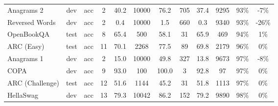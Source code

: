 \documentclass{article}
\begin{document}
\begin{table}
{\begin{adjustwidth}{-1.4in}{-1.4in}
\begin{center}
\begin{tabular}{lccccccccccc}
          Anagrams 2 &   dev &      acc &   2 &        40.2 &                     10000 &                            76.2 &                       705 &                            37.4 &                      9295 &                            93\% &                                                -7\% \\
      Reversed Words &   dev &      acc &   2 &         0.4 &                     10000 &                             1.5 &                       660 &                             0.3 &                      9340 &                            93\% &                                               -26\% \\
          OpenBookQA &  test &      acc &   8 &        65.4 &                       500 &                            58.1 &                        31 &                            65.9 &                       469 &                            94\% &                                                 1\% \\
          ARC (Easy) &  test &      acc &  11 &        70.1 &                      2268 &                            77.5 &                        89 &                            69.8 &                      2179 &                            96\% &                                                 0\% \\
          Anagrams 1 &   dev &      acc &   2 &        15.0 &                     10000 &                            49.8 &                       327 &                            13.8 &                      9673 &                            97\% &                                                -8\% \\
                COPA &   dev &      acc &   9 &        93.0 &                       100 &                           100.0 &                         3 &                            92.8 &                        97 &                            97\% &                                                 0\% \\
     ARC (Challenge) &  test &      acc &  12 &        51.6 &                      1144 &                            45.2 &                        31 &                            51.8 &                      1113 &                            97\% &                                                 0\% \\
           HellaSwag &   dev &      acc &  13 &        79.3 &                     10042 &                            86.2 &                       152 &                            79.2 &                      9890 &                            98\% &                                                 0\% \\

\end{tabular}
\end{center}
\end{adjustwidth}}
\end{table}
\end{document}
